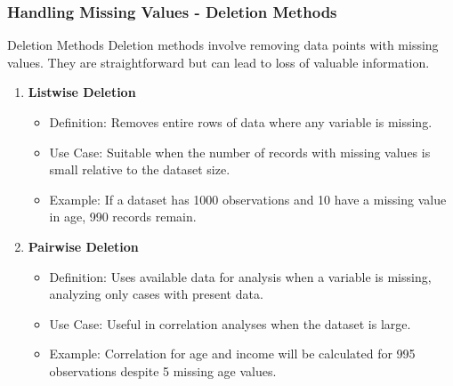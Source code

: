 \documentclass[aspectratio=169]{beamer}
\begin{document}
\begin{frame}[fragile]
    \frametitle{Handling Missing Values - Deletion Methods}
    \begin{block}{Deletion Methods}
        Deletion methods involve removing data points with missing values. They are straightforward but can lead to loss of valuable information.
    \end{block}
    \begin{enumerate}
        \item \textbf{Listwise Deletion}
        \begin{itemize}
            \item Definition: Removes entire rows of data where any variable is missing.
            \item Use Case: Suitable when the number of records with missing values is small relative to the dataset size.
            \item Example: If a dataset has 1000 observations and 10 have a missing value in age, 990 records remain.
        \end{itemize}
        \item \textbf{Pairwise Deletion}
        \begin{itemize}
            \item Definition: Uses available data for analysis when a variable is missing, analyzing only cases with present data.
            \item Use Case: Useful in correlation analyses when the dataset is large.
            \item Example: Correlation for age and income will be calculated for 995 observations despite 5 missing age values.
        \end{itemize}
    \end{enumerate}
\end{frame}
\end{document}
